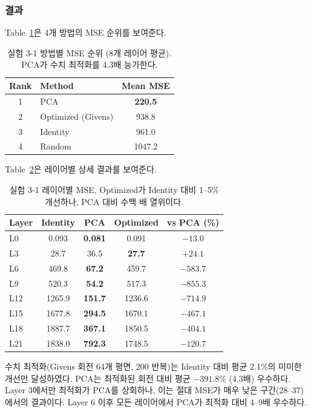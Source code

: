 \documentclass[11pt,a4paper]{article}
\begin{document}
\subsubsection{결과}

Table~\ref{tab:exp31_rank}은 4개 방법의 MSE 순위를 보여준다.

\begin{table}[H]
\centering
\caption{실험 3-1 방법별 MSE 순위 (8개 레이어 평균). PCA가 수치 최적화를 4.3배 능가한다.}
\label{tab:exp31_rank}
\begin{tabular}{clc}
\toprule
\textbf{Rank} & \textbf{Method} & \textbf{Mean MSE} \\
\midrule
1 & PCA & \textbf{220.5} \\
2 & Optimized (Givens) & 938.8 \\
3 & Identity & 961.0 \\
4 & Random & 1047.2 \\
\bottomrule
\end{tabular}
\end{table}

Table~\ref{tab:exp31_layer}은 레이어별 상세 결과를 보여준다.

\begin{table}[H]
\centering
\caption{실험 3-1 레이어별 MSE. Optimized가 Identity 대비 1--5\% 개선하나, PCA 대비 수백 배 열위이다.}
\label{tab:exp31_layer}
\begin{tabular}{lcccc}
\toprule
\textbf{Layer} & \textbf{Identity} & \textbf{PCA} & \textbf{Optimized} & \textbf{vs PCA (\%)} \\
\midrule
L0 & 0.093 & \textbf{0.081} & 0.091 & $-13.0$ \\
L3 & 28.7 & 36.5 & \textbf{27.7} & $+24.1$ \\
L6 & 469.8 & \textbf{67.2} & 459.7 & $-583.7$ \\
L9 & 520.3 & \textbf{54.2} & 517.3 & $-855.3$ \\
L12 & 1265.9 & \textbf{151.7} & 1236.6 & $-714.9$ \\
L15 & 1677.8 & \textbf{294.5} & 1670.1 & $-467.1$ \\
L18 & 1887.7 & \textbf{367.1} & 1850.5 & $-404.1$ \\
L21 & 1838.0 & \textbf{792.3} & 1748.5 & $-120.7$ \\
\bottomrule
\end{tabular}
\end{table}

수치 최적화(Givens 회전 64개 평면, 200 반복)는 Identity 대비 평균 2.1\%의 미미한 개선만 달성하였다.
PCA는 최적화된 회전 대비 평균 $-391.8\%$ (4.3배) 우수하다.
Layer 3에서만 최적화가 PCA를 상회하나, 이는 절대 MSE가 매우 낮은 구간(28--37)에서의 결과이다.
Layer 6 이후 모든 레이어에서 PCA가 최적화 대비 4--9배 우수하다.
\end{document}
